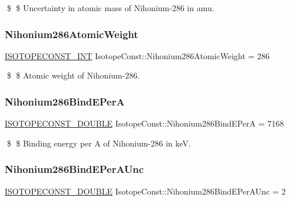 \$ \$ Uncertainty in atomic mass of Nihonium-\/286 in amu. \mbox{\label{group___isotope_const-_nihonium-_nh286_ga3d76018d6b305dfa9ec1e5baef2e2f73}} 
\subsubsection{\texorpdfstring{Nihonium286\+Atomic\+Weight}{Nihonium286AtomicWeight}}
{\footnotesize\ttfamily \mbox{\hyperlink{group___isotope_const-_macros_ga5f18360b3e99483a35c32d789e62621c}{I\+S\+O\+T\+O\+P\+E\+C\+O\+N\+S\+T\+\_\+\+I\+NT}} Isotope\+Const\+::\+Nihonium286\+Atomic\+Weight = 286}

\$ \$ Atomic weight of Nihonium-\/286. \mbox{\label{group___isotope_const-_nihonium-_nh286_gaa575922923cb4e97ac8e5efda8f19953}} 
\subsubsection{\texorpdfstring{Nihonium286\+Bind\+E\+PerA}{Nihonium286BindEPerA}}
{\footnotesize\ttfamily \mbox{\hyperlink{group___isotope_const-_macros_ga8f45a7272ce02c0b4c65c44636ed719a}{I\+S\+O\+T\+O\+P\+E\+C\+O\+N\+S\+T\+\_\+\+D\+O\+U\+B\+LE}} Isotope\+Const\+::\+Nihonium286\+Bind\+E\+PerA = 7168}

\$ \$ Binding energy per A of Nihonium-\/286 in keV. \mbox{\label{group___isotope_const-_nihonium-_nh286_ga698647df3ce7d2da23c114824145bca6}} 
\subsubsection{\texorpdfstring{Nihonium286\+Bind\+E\+Per\+A\+Unc}{Nihonium286BindEPerAUnc}}
{\footnotesize\ttfamily \mbox{\hyperlink{group___isotope_const-_macros_ga8f45a7272ce02c0b4c65c44636ed719a}{I\+S\+O\+T\+O\+P\+E\+C\+O\+N\+S\+T\+\_\+\+D\+O\+U\+B\+LE}} Isotope\+Const\+::\+Nihonium286\+Bind\+E\+Per\+A\+Unc = 2}

